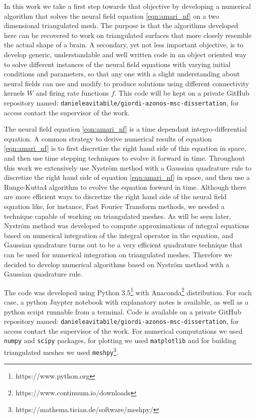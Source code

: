 \documentclass{uonmathreport}
\begin{document}
In this work we take a first step towards that objective by developing a numerical algorithm that solves the neural field equation \ref{eqn:amari_nf} on a two dimensional triangulated mesh. The purpose is that the algorithms developed here can be recovered to work on triangulated surfaces that more closely resemble the actual shape of a brain. A secondary, yet not less important objective, is to develop generic, understandable and well written code in an object oriented way to solve different instances of the neural field equations with varying initial conditions and parameters, so that any one with a slight understanding about neural fields can use and modify to produce solutions using different connectivity kernels $W$ and firing rate functions $f$. This code will be kept on a private GitHub repository named: \texttt{danieleavitabile/giordi-azonos-msc-dissertation}, for access contact the supervisor of the work.

The neural field equation \ref{eqn:amari_nf} is a time dependant integro-differential equation. A common strategy to derive numerical results of equation \ref{eqn:amari_nf} is to first discretize the right hand side of this equation in space, and then use time stepping techniques to evolve it forward in time. Throughout this work we extensively use Nystr\"om method with a Gaussian quadrature rule to discretize the right hand side of equation \ref{eqn:amari_nf} in space, and then use a Runge-Kutta4 algorithm to evolve the equation forward in time. Although there are more efficient ways to discretize the right hand side of the neural field equation like, for instance, Fast Fourier Transform methods, we needed a technique capable of working on triangulated meshes. As will be seen later, Nystr\"om method was developed to compute approximations of integral equations based on numerical integration of the integral operator in the equation, and Gaussian quadrature turns out to be a very efficient quadrature technique that can be used for numerical integration on triangulated meshes. Therefore we decided to develop numerical algorithms based on Nystr\"om method with a Gaussian quadrature rule.

The code was developed using Python 3.5\footnote{https://www.python.org} with Anaconda\footnote{https://www.continuum.io/downloads} distribution. For each case, a python Juypter notebook with explanatory notes is available, as well as a python script runnable from a terminal. Code is available on a private GitHub repository named: \texttt{danieleavitabile/giordi-azonos-msc-dissertation}, for access contact the supervisor of the work. For numerical computations we used \texttt{numpy} and \texttt{scipy} packages, for plotting we used \texttt{matplotlib} and for building triangulated meshes we used \texttt{meshpy}\footnote{https://mathema.tician.de/software/meshpy/}.  
\end{document}
